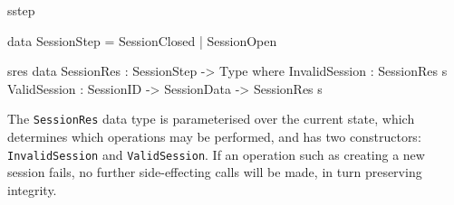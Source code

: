 \begin{SaveVerbatim}{sstep}

data SessionStep = SessionClosed | SessionOpen
\end{SaveVerbatim}

\begin{SaveVerbatim}{sres}
data SessionRes : SessionStep -> Type where
  InvalidSession : SessionRes s  
  ValidSession   : SessionID -> 
                   SessionData -> 
                   SessionRes s

\end{SaveVerbatim}




The \texttt{SessionRes} data type is parameterised over the current state,
which determines which operations may be performed, and has two constructors:
\texttt{InvalidSession} and \texttt{ValidSession}. If an operation such as
creating a new session fails, no further side-effecting calls will be made, in
turn preserving integrity. 


